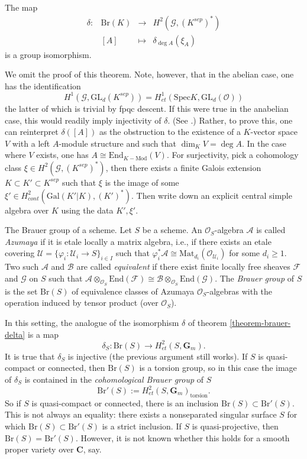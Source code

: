 \begin{theorem}
\label{theorem-brauer-delta}
The map
$$
\begin{matrix}
\delta : & \text{Br}(K) & \longrightarrow & H^2(\mathcal{G}, (K^{sep})^*) \\
& [A] & \longmapsto & \delta_{\deg A} (\xi_A)
\end{matrix}
$$
is a group isomorphism.
\end{theorem}

\noindent
We omit the proof of this theorem. Note, however, that in the abelian case, one
has the identification
$$
H^1 (\mathcal{G}, \text{GL}_d(K^{sep})) = H_{et}^1 (\text{Spec} K,
\text{GL}_d(\mathcal{O}))
$$
the latter of which is trivial by fpqc descent. If this were true in the
anabelian case, this would readily imply injectivity of $\delta$. (See
\cite{SGA4.5}.) Rather, to prove this, one can reinterpret $\delta([A])$ as the
obstruction to the existence of a $K$-vector space $V$ with a left $A$-module
structure and such that $\dim_K V = \deg A$. In the case where $V$ exists, one
has $A \cong \text{End}_{K-\text{Mod}} (V)$. For surjectivity, pick a
cohomology class $\xi \in H^2(\mathcal{G}, (K^{sep})^*)$, then there exists a
finite Galois extension $K \subset K' \subset K^{sep}$ such that $\xi$ is
the image of some $\xi' \in H_{cont}^2(\text{Gal}(K'|K), (K')^*)$. Then write
down an explicit central simple algebra over $K$ using the data $K', \xi'$.

\medskip\noindent
The Brauer group of a scheme.
Let $S$ be a scheme. An $\mathcal{O}_S$-algebra $\mathcal{A}$ is called
{\it Azumaya} if it is etale locally a matrix algebra, i.e., if there
exists an etale covering $\mathcal{U} = \{ \varphi_i : \mathcal{U}_i \to S
\}_{i \in I}$ such that $\varphi_i^*\mathcal{A} \cong
\text{Mat}_{d_i}(\mathcal{O}_{\mathcal{U}_i})$ for some $d_i \geq 1$. Two such
$\mathcal{A}$ and $\mathcal{B}$ are called {\it equivalent} if there exist
finite locally free sheaves $\mathcal{F}$ and $\mathcal{G}$ on $S$ such that
$\mathcal{A} \otimes_{\mathcal{O}_S} \text{End}(\mathcal{F}) \cong \mathcal{B}
\otimes_{\mathcal{O}_S} \text{End}(\mathcal{G})$. The {\it Brauer group} of
$S$ is the set $\text{Br}(S)$ of equivalence classes of Azumaya
$\mathcal{O}_S$-algebras with the operation induced by tensor product (over
$\mathcal{O}_S$).

\medskip\noindent
In this setting, the analogue of the isomorphism $\delta$ of theorem
\ref{theorem-brauer-delta} is a map
$$
\delta_S: \text{Br}(S) \to H_{et}^2(S,\mathbf{G}_m).
$$
It is true that $\delta_S$ is injective (the previous argument still works). If
$S$ is quasi-compact or connected, then $\text{Br}(S)$ is a torsion group, so
in this case the image of $\delta_S$ is contained in the {\it cohomological
Brauer group} of $S$
$$
\text{Br}'(S) := H_{et}^2(S,\mathbf{G}_m)_\text{torsion}.
$$
So if $S$ is quasi-compact or connected, there is an inclusion $\text{Br}(S)
\subset \text{Br}'(S)$. This is not always an equality: there exists a
nonseparated singular surface $S$ for which $\text{Br}(S) \subset
\text{Br}'(S)$ is a strict inclusion. If $S$ is quasi-projective, then
$\text{Br}(S) = \text{Br}'(S)$. However, it is not known whether this holds for
a smooth proper variety over $\mathbf{C}$, say.



